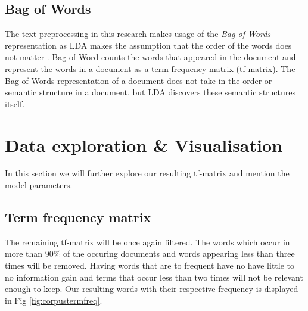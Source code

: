 \subsection{Bag of Words} \label{methodology:bagow}
The text preprocessing in this research makes usage of the \textit{Bag of Words} representation as LDA makes the assumption that the order of the words does not matter \cite{Blei2010}. Bag of Word counts the words that appeared in the document and represent the words in a document as a term-frequency matrix (tf-matrix). The Bag of Words representation of a document does not take in the order or semantic structure in a document, but LDA discovers these semantic structures itself. 

\section{Data exploration \& Visualisation} \label{methodology:explo&visu}
In this section we will further explore our resulting tf-matrix and mention the model parameters.

\subsection{Term frequency matrix}
The remaining tf-matrix will be once again filtered. The words which occur in more than 90\% of the occuring documents and words appearing less than three times will be removed. Having words that are to frequent have no have little to no information gain and terms that occur less than two times will not be relevant enough to keep. Our resulting words with their respective frequency is displayed in Fig \ref{fig:corpustermfreq}.

